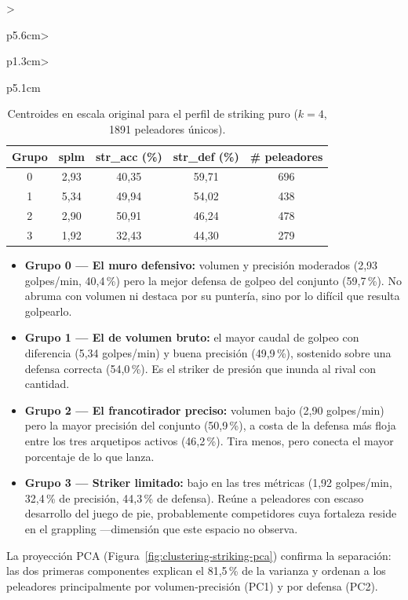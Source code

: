 \documentclass[11pt,a4paper]{article}
\begin{document}
\begin{longtable}{>{\raggedright\arraybackslash}p{5.6cm}>{\raggedright\arraybackslash}p{1.3cm}>{\raggedright\arraybackslash}p{5.1cm}}
\begin{table}[H]
    \centering
    \footnotesize
    \setlength{\tabcolsep}{5pt}
    \begin{tabular}{ccccc}
        \toprule
        \textbf{Grupo} & \textbf{splm} & \textbf{str\_acc (\%)} & \textbf{str\_def (\%)} & \textbf{\# peleadores} \\
        \midrule
        0 & 2{,}93 & 40{,}35 & 59{,}71 & 696 \\
        1 & 5{,}34 & 49{,}94 & 54{,}02 & 438 \\
        2 & 2{,}90 & 50{,}91 & 46{,}24 & 478 \\
        3 & 1{,}92 & 32{,}43 & 44{,}30 & 279 \\
        \bottomrule
    \end{tabular}
    \caption{Centroides en escala original para el perfil de striking puro ($k = 4$, 1891 peleadores únicos).}
    \label{tab:centroides-striking}
\end{table}

\begin{itemize}
    \item \textbf{Grupo 0 — El muro defensivo:} volumen y precisión moderados (2,93 golpes/min, 40,4\,\%) pero la mejor defensa de golpeo del conjunto (59,7\,\%). No abruma con volumen ni destaca por su puntería, sino por lo difícil que resulta golpearlo.
    \item \textbf{Grupo 1 — El de volumen bruto:} el mayor caudal de golpeo con diferencia (5,34 golpes/min) y buena precisión (49,9\,\%), sostenido sobre una defensa correcta (54,0\,\%). Es el striker de presión que inunda al rival con cantidad.
    \item \textbf{Grupo 2 — El francotirador preciso:} volumen bajo (2,90 golpes/min) pero la mayor precisión del conjunto (50,9\,\%), a costa de la defensa más floja entre los tres arquetipos activos (46,2\,\%). Tira menos, pero conecta el mayor porcentaje de lo que lanza.
    \item \textbf{Grupo 3 — Striker limitado:} bajo en las tres métricas (1,92 golpes/min, 32,4\,\% de precisión, 44,3\,\% de defensa). Reúne a peleadores con escaso desarrollo del juego de pie, probablemente competidores cuya fortaleza reside en el grappling —dimensión que este espacio no observa.
\end{itemize}

La proyección PCA (Figura~\ref{fig:clustering-striking-pca}) confirma la separación: las dos primeras componentes explican el 81,5\,\% de la varianza y ordenan a los peleadores principalmente por volumen-precisión (PC1) y por defensa (PC2).


\end{longtable}
\end{document}
